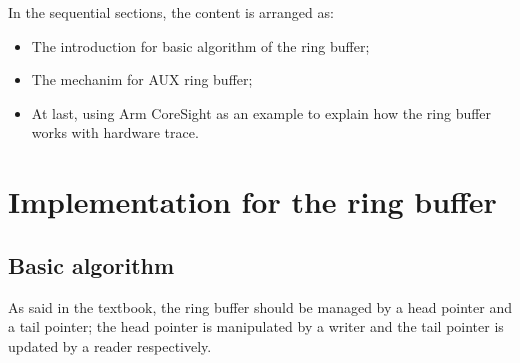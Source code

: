 \documentclass[11pt]{diazessay} %
\begin{document}
In the sequential sections, the content is arranged as:
\begin{itemize}
	\item The introduction for basic algorithm of the ring buffer;
	\item The mechanim for AUX ring buffer;
	\item At last, using Arm CoreSight as an example to explain how the ring buffer works with hardware trace.
\end{itemize}

\section*{Implementation for the ring buffer}

\subsection*{Basic algorithm}

As said in the textbook, the ring buffer should be managed by a head pointer and a tail pointer; the head pointer is manipulated by a writer and the tail pointer is updated by a reader respectively.
\end{document}
